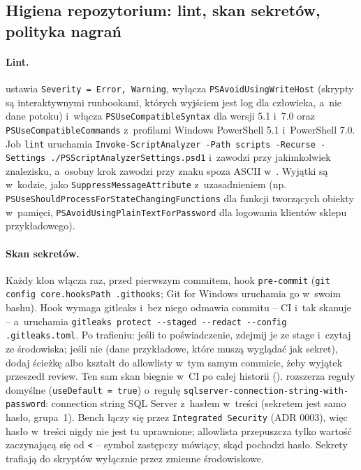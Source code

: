 \subsection{Higiena repozytorium: lint, skan sekretów, polityka nagrań}\label{sec:bench-higiena}

\paragraph{Lint.}  ustawia \texttt{Severity = Error,
Warning}, wyłącza \texttt{PSAvoidUsingWriteHost} (skrypty są interaktywnymi runbookami,
których wyjściem jest log dla człowieka, a~nie dane potoku) i~włącza
\texttt{PSUseCompatibleSyntax} dla wersji 5.1 i~7.0 oraz \texttt{PSUseCompatibleCommands}
z~profilami Windows PowerShell 5.1 i~PowerShell 7.0. Job \texttt{lint} uruchamia
\texttt{Invoke-ScriptAnalyzer -Path scripts -Recurse -Settings
./PSScriptAnalyzerSettings.psd1} i~zawodzi przy jakimkolwiek znalezisku, a~osobny krok
zawodzi przy znaku spoza ASCII w~. Wyjątki są w~kodzie, jako
\texttt{SuppressMessageAttribute} z~uzasadnieniem (np.
\texttt{PSUseShouldProcessForStateChangingFunctions} dla funkcji tworzących obiekty
w~pamięci, \texttt{PSAvoidUsingPlainTextForPassword} dla logowania klientów sklepu
przykładowego).

\paragraph{Skan sekretów.} Każdy klon włącza raz, przed pierwszym commitem, hook
\texttt{pre-commit} (\texttt{git config core.hooksPath .githooks}; Git for Windows
uruchamia go w~swoim bashu). Hook wymaga gitleaks i~bez niego odmawia commitu -- CI i~tak
skanuje -- a~uruchamia \texttt{gitleaks protect -{}-staged -{}-redact -{}-config
.gitleaks.toml}. Po trafieniu: jeśli to poświadczenie, zdejmij je ze stage i~czytaj ze
środowiska; jeśli nie (dane przykładowe, które muszą wyglądać jak sekret), dodaj ścieżkę
albo kształt do allowlisty  w~tym samym commicie, żeby wyjątek przeszedł
review. Ten sam skan biegnie w~CI po całej historii ().
 rozszerza reguły domyślne (\texttt{useDefault = true}) o~regułę
\texttt{sqlserver-connection-string-with-password}: connection string SQL Server
z~hasłem w~treści (sekretem jest samo hasło, grupa~1). Bench łączy się przez
\texttt{Integrated Security} (ADR 0003), więc hasło w~treści nigdy nie jest tu uprawnione;
allowlista przepuszcza tylko wartość zaczynającą się od \texttt{<} -- symbol zastępczy
mówiący, skąd pochodzi hasło. Sekrety trafiają do skryptów wyłącznie przez zmienne
środowiskowe.

